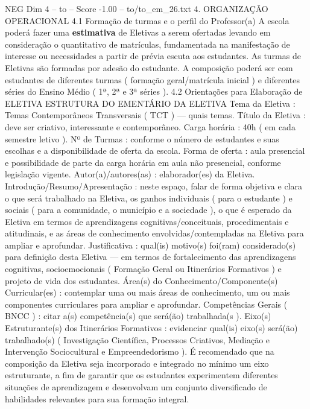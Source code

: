 \begin{textsample}{NEG Dim 4 – to – Score -1.00 – to/to\_em\_26.txt}  \label{ex:f4_neg_088}
4.
ORGANIZAÇÃO OPERACIONAL 4.1 Formação de turmas e o perfil do Professor(a) A escola poderá fazer uma \textbf{estimativa} de Eletivas a serem ofertadas levando em consideração o quantitativo de matrículas, fundamentada na manifestação de interesse ou necessidades a partir de prévia escuta aos estudantes.
As turmas de Eletivas são formadas por adesão do estudante.
A composição poderá ser com estudantes de diferentes turmas ( formação geral/matrícula inicial ) e diferentes séries do Ensino Médio ( 1ª, 2ª e 3ª séries ). 4.2 Orientações para Elaboração de ELETIVA ESTRUTURA DO EMENTÁRIO DA ELETIVA Tema da Eletiva : Temas Contemporâneos Transversais ( TCT ) — quais temas.
Título da Eletiva : deve ser criativo, interessante e contemporâneo.
Carga horária : 40h ( em cada semestre letivo ).
Nº de Turmas : conforme o número de estudantes e suas escolhas e a disponibilidade de oferta da escola.
Forma de oferta : aula presencial e possibilidade de parte da carga horária em aula não presencial, conforme legislação vigente.
Autor(a)/autores(as) : elaborador(es) da Eletiva.
Introdução/Resumo/Apresentação : neste espaço, falar de forma objetiva e clara o que será trabalhado na Eletiva, os ganhos individuais ( para o estudante ) e sociais ( para a comunidade, o município e a sociedade ), o que é esperado da Eletiva em termos de aprendizagens cognitivas/conceituais, procedimentais e atitudinais, e as áreas de conhecimento envolvidas/contempladas na Eletiva para ampliar e aprofundar.
Justificativa : qual(is) motivo(s) foi(ram) considerado(s) para definição desta Eletiva — em termos de fortalecimento das aprendizagens cognitivas, socioemocionais ( Formação Geral ou Itinerários Formativos ) e projeto de vida dos estudantes.
Área(s) do Conhecimento/Componente(s) Curricular(es) : contemplar uma ou mais áreas de conhecimento, um ou mais componentes curriculares para ampliar e aprofundar.
Competências Gerais ( BNCC ) : citar a(s) competência(s) que será(ão) trabalhada(s ).
Eixo(s) Estruturante(s) dos Itinerários Formativos : evidenciar qual(is) eixo(s) será(ão) trabalhado(s) ( Investigação Científica, Processos Criativos, Mediação e Intervenção Sociocultural e Empreendedorismo ).
É recomendado que na composição da Eletiva seja incorporado e integrado no mínimo um eixo estruturante, a fim de garantir que os estudantes experimentem diferentes situações de aprendizagem e desenvolvam um conjunto diversificado de habilidades relevantes para sua formação integral.

\end{textsample}
